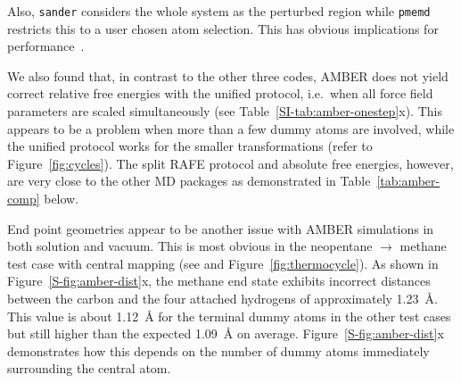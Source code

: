\documentclass[journal=jctcce,manuscript=article]{achemso}
\newcommand{\progname}[1]{\texttt{#1}}
\begin{document}
Also, \progname{sander} considers the whole system as the perturbed
region while \progname{pmemd} restricts this to a user chosen atom selection.  
This has obvious implications for performance~\cite{doi:10.1021/ct400340s}.

We also found that, in contrast to the other three codes, AMBER does not yield
correct relative free energies with the unified protocol, i.e.\
when all force field parameters are scaled simultaneously (see 
Table~\ref{SI-tab:amber-onestep}x).
  This appears to be a problem when more than 
a few dummy atoms are involved, while the unified protocol works for the 
smaller transformations (refer to Figure~\ref{fig:cycles}).  The split RAFE 
protocol and absolute free energies, however, are very close to the other MD 
packages as demonstrated in Table~\ref{tab:amber-comp} below.

End point geometries appear to be another issue with AMBER simulations
in both solution and vacuum.  This is most obvious in the neopentane 
$\rightarrow$ methane test case with central mapping (see 
 and Figure~\ref{fig:thermocycle}).
As shown in Figure~\ref{S-fig:amber-dist}x, the methane end state exhibits 
incorrect distances between the carbon and the four 
attached hydrogens of approximately \SI{1.23}{\angstrom}.  This value is about 
\SI{1.12}{\angstrom} for the terminal dummy atoms in the other test cases but 
still higher than the expected \SI{1.09}{\angstrom} on average.  
Figure~\ref{S-fig:amber-dist}x demonstrates how this depends on the number of 
dummy atoms immediately surrounding the central atom.
\end{document}
